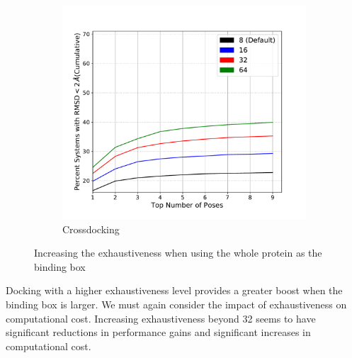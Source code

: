 \documentclass[journal=jcisd8,manuscript=article]{achemso}
\begin{document}
\begin{figure}
\begin{subfigure}[b]{0.48\textwidth}
    		\includegraphics[width=\textwidth]{figures/crossdocking/whole_ptn_sweep_exhaustiveness_line.pdf}
    		\caption{Crossdocking}
            \label{fig:WholeProteinExhCD}
        \end{subfigure}    
	\caption{Increasing the exhaustiveness when using the whole protein as the binding box}
        \label{fig:WholeProteinExh}
\end{figure}
Docking with a higher exhaustiveness level provides a greater boost when the binding box is larger. We must again consider the impact of exhaustiveness on computational cost. Increasing exhaustiveness beyond 32 seems to have significant reductions in performance gains and significant increases in computational cost. 
\end{document}
